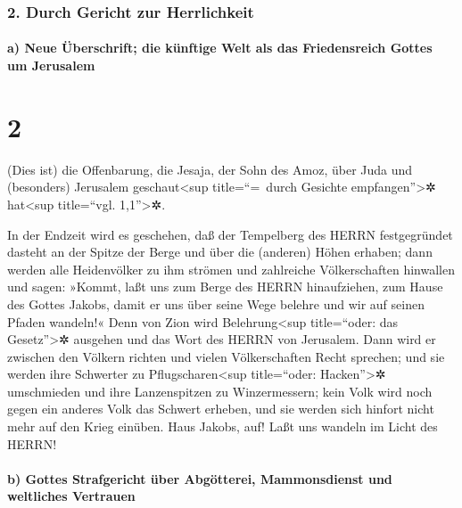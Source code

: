 \hypertarget{durch-gericht-zur-herrlichkeit}{%
\subsubsection{2. Durch Gericht zur
Herrlichkeit}\label{durch-gericht-zur-herrlichkeit}}

\hypertarget{a-neue-uxfcberschrift-die-kuxfcnftige-welt-als-das-friedensreich-gottes-um-jerusalem}{%
\paragraph{a) Neue Überschrift; die künftige Welt als das Friedensreich
Gottes um
Jerusalem}\label{a-neue-uxfcberschrift-die-kuxfcnftige-welt-als-das-friedensreich-gottes-um-jerusalem}}

\hypertarget{section-1}{%
\section{2}\label{section-1}}

(Dies ist) die Offenbarung, die Jesaja, der Sohn des Amoz,
über Juda und (besonders) Jerusalem geschaut\textless sup
title=``=~durch Gesichte empfangen''\textgreater✲ hat\textless sup
title=``vgl. 1,1''\textgreater✲.

In der Endzeit wird es geschehen, daß der Tempelberg des
HERRN festgegründet dasteht an der Spitze der Berge und über die
(anderen) Höhen erhaben; dann werden alle Heidenvölker zu ihm strömen
und zahlreiche Völkerschaften hinwallen und sagen: »Kommt,
laßt uns zum Berge des HERRN hinaufziehen, zum Hause des Gottes Jakobs,
damit er uns über seine Wege belehre und wir auf seinen Pfaden wandeln!«
Denn von Zion wird Belehrung\textless sup title=``oder: das
Gesetz''\textgreater✲ ausgehen und das Wort des HERRN von Jerusalem.
Dann wird er zwischen den Völkern richten und vielen
Völkerschaften Recht sprechen; und sie werden ihre Schwerter zu
Pflugscharen\textless sup title=``oder: Hacken''\textgreater✲
umschmieden und ihre Lanzenspitzen zu Winzermessern; kein Volk wird noch
gegen ein anderes Volk das Schwert erheben, und sie werden sich hinfort
nicht mehr auf den Krieg einüben. Haus Jakobs, auf! Laßt
uns wandeln im Licht des HERRN!

\hypertarget{b-gottes-strafgericht-uxfcber-abguxf6tterei-mammonsdienst-und-weltliches-vertrauen}{%
\paragraph{b) Gottes Strafgericht über Abgötterei, Mammonsdienst und
weltliches
Vertrauen}\label{b-gottes-strafgericht-uxfcber-abguxf6tterei-mammonsdienst-und-weltliches-vertrauen}}

